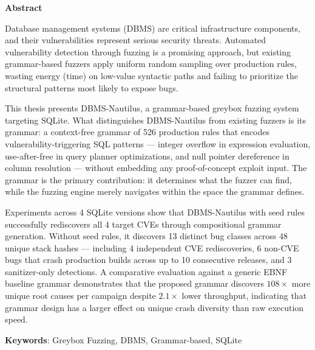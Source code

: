 \begin{center}
\textbf{\large{Abstract}}
\end{center}

\begin{small}

Database management systems (DBMS) are critical infrastructure components, and their vulnerabilities represent serious security threats. Automated vulnerability detection through fuzzing is a promising approach, but existing grammar-based fuzzers apply uniform random sampling over production rules, wasting energy (time) on low-value syntactic paths and failing to prioritize the structural patterns most likely to expose bugs.

This thesis presents DBMS-Nautilus, a grammar-based greybox fuzzing system targeting SQLite. What distinguishes DBMS-Nautilus from existing fuzzers is its grammar: a context-free grammar of 526 production rules that encodes vulnerability-triggering SQL patterns --- integer overflow in expression evaluation, use-after-free in query planner optimizations, and null pointer dereference in column resolution --- without embedding any proof-of-concept exploit input. The grammar is the primary contribution: it determines what the fuzzer can find, while the fuzzing engine merely navigates within the space the grammar defines.

Experiments across 4 SQLite versions show that DBMS-Nautilus with seed rules successfully rediscovers all 4 target CVEs through compositional grammar generation. Without seed rules, it discovers 13 distinct bug classes across 48 unique stack hashes --- including 4 independent CVE rediscoveries, 6 non-CVE bugs that crash production builds across up to 10 consecutive releases, and 3 sanitizer-only detections. A comparative evaluation against a generic EBNF baseline grammar demonstrates that the proposed grammar discovers $108\times$ more unique root causes per campaign despite $2.1\times$ lower throughput, indicating that grammar design has a larger effect on unique crash diversity than raw execution speed.

\vspace*{1cm}
\textbf{Keywords}: Greybox Fuzzing, DBMS, Grammar-based, SQLite
\end{small}
